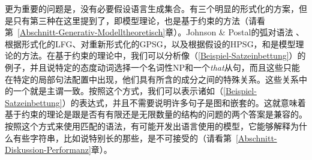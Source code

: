 更为重要的问题是，没有必要假设语言生成集合。有三个明显的形式化的方案，但是只有第三种在这里提到了，即模型理论，也是基于约束的方法（请看第~\ref{Abschnitt-Generativ-Modelltheoretisch}章）。Johnson \& Postal的弧对语法 \citeyearpar{JP80a-u}、根据\citet{Kaplan95a}形式化的LFG\indexlfg、对\citet{Rogers97a}重新形式化的GPSG\indexgpsg，以及根据\citet{King99a-u}假设的HPSG\indexhpsg，\citet{Pollard99a}和\citet{Richter2007a}是模型理论的方法。在基于约束的理论中，我们可以分析像（\ref{Beispiel-Satzeinbettung}）的例子，并且说特定的态度动词选择一个名词性NP和一个\emph{that}从句，而且这些只能在特定的局部句法配置中出现，他们具有所含的成分之间的特殊关系。这些关系中的一个就是主谓一致。按照这个方式，我们可以表示诸如（\ref{Beispiel-Satzeinbettung}）的表达式，并且不需要说明许多句子是图和嵌套的。这就意味着基于约束的理论是跟是否有有限还是无限数量的结构的问题的两个答案是兼容的。按照这个方式来使用匹配的语法，有可能开发出语言使用的模型，它能够解释为什么有些字符串，比如说特别长的那些，是不可接受的（请看第~\ref{Abschnitt-Diskussion-Performanz}章）。

